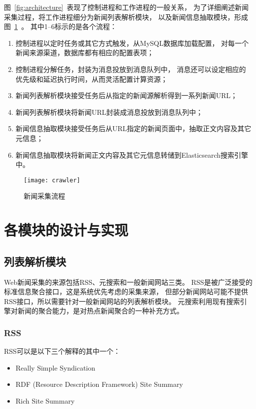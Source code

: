 图~\ref{fig:architecture}~表现了控制进程和工作进程的一般关系，
为了详细阐述新闻采集过程，将工作进程细分为新闻列表解析模块，
以及新闻信息抽取模块，形成图~\ref{fig:crawler}~。
其中1--6标示的是各个流程：
\begin{enumerate}
\item 控制进程以定时任务或其它方式触发，从MySQL数据库加载配置，
对每一个新闻来源渠道，数据库都有相应的配置表项；
\item 控制进程分解任务，封装为消息投放到消息队列中，
消息还可以设定相应的优先级和延迟执行时间，从而灵活配置计算资源；
\item 新闻列表解析模块接受任务后从指定的新闻源解析得到一系列新闻URL；
\item 新闻列表解析模块将新闻URL封装成消息投放到消息队列中；
\item 新闻信息抽取模块接受任务后从URL指定的新闻页面中，抽取正文内容及其它元信息；
\item 新闻信息抽取模块将新闻正文内容及其它元信息转储到Elasticsearch搜索引擎中。
\end{enumerate}

\begin{figure}[htbp]
\centering
\texttt{[image: crawler]}
\caption{新闻采集流程}
\label{fig:crawler}
\end{figure}

\section{各模块的设计与实现}
\label{sec:system-module}

\subsection{列表解析模块}
Web新闻采集的来源包括RSS、元搜索和一般新闻网站三类。
RSS是被广泛接受的标准信息聚合接口，这是系统优先考虑的采集来源，
但部分新闻网站可能不提供RSS接口，所以需要针对一般新闻网站的列表解析模块。
元搜索利用现有搜索引擎对新闻的聚合能力，是对热点新闻聚合的一种补充方式。

\subsubsection{RSS}
RSS可以是以下三个解释的其中一个：
\begin{itemize}
\item Really Simple Syndication
\item RDF (Resource Description Framework) Site Summary
\item Rich Site Summary
\end{itemize}

